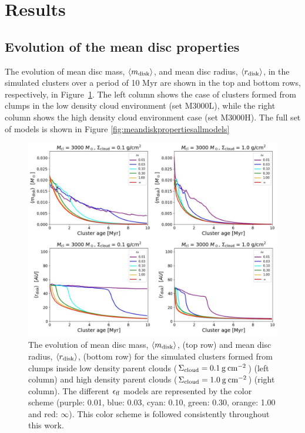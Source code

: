 \documentclass[fleqn,usenatbib]{mnras}
\newcommand\sfeff{\ensuremath{\epsilon_{\rm ff}}\xspace}   %
\begin{document}
\section{Results}
\label{sec:results}

\subsection{Evolution of the mean disc properties}
\label{subsec:meandiskproperties}

The evolution of mean disc mass, $\langle m_{\rm disk} \rangle$, and mean disc radius, $\langle r_{\rm disk} \rangle$, in the simulated clusters over a period of 10 Myr are shown in the top and bottom rows, respectively, in Figure~\ref{fig:meandiskpropertyevolution_clusterage}. The left column shows the case of clusters formed from clumps in the low density cloud environment (set M3000L), while the right column shows the high density cloud environment case (set M3000H). The full set of models is shown in Figure \ref{fig:meandiskpropertiesallmodels}

\begin{figure}
    \includegraphics[width=\textwidth]{figures/PanelMeanDiscProperties.pdf}
    \caption{The evolution of mean disc mass, $\langle m_{\rm disk} \rangle$, (top row) and mean disc radius, $\langle r_{\rm disk} \rangle$, (bottom row) for the simulated clusters formed from clumps inside low density parent clouds ($\Sigma_{\rm cloud}=0.1\:\rm g\:cm^{-2}$) (left column) and high density parent clouds ($\Sigma_{\rm cloud}=1.0\:\rm g\:cm^{-2}$) (right column). The different \sfeff models are represented by the color scheme (purple: 0.01, blue: 0.03, cyan: 0.10, green: 0.30, orange: 1.00 and red: $\infty$). This color scheme is followed consistently throughout this work.}
\label{fig:meandiskpropertyevolution_clusterage}
\end{figure}
\end{document}

